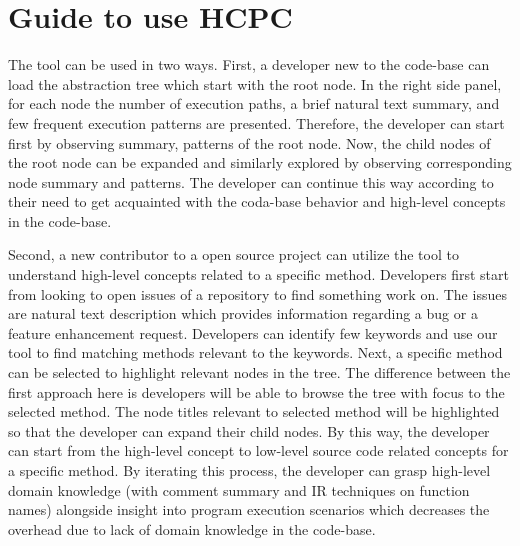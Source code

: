\section{Guide to use HCPC}
The tool can be used in two ways. First, a developer new to the code-base can load the abstraction tree which start with the root node. In the right side panel, for each node the number of execution paths, a brief natural text summary, and few frequent execution patterns are presented. Therefore, the developer can start first by observing summary, patterns of the root node. Now, the child nodes of the root node can be expanded and  similarly explored by observing corresponding node summary and patterns. The developer can continue this way according to their need to get acquainted with the coda-base behavior and high-level concepts in the code-base.

Second, a new contributor to a open source project can utilize the tool to understand high-level concepts related to a specific method. Developers first start from looking to open issues of a repository to find something work on. The issues are natural text description which provides information regarding a bug or a feature enhancement request. Developers can identify few keywords and use our tool to find matching methods relevant to the keywords. Next, a specific method can be selected to highlight relevant nodes in the tree. The difference between the first approach here is developers will be able to browse the tree with focus to the selected method. The node titles relevant to selected method will be highlighted so that the developer can expand their child nodes. By this way, the developer can start from the high-level concept to low-level source code related concepts for a specific method. By iterating this process, the developer can grasp high-level domain knowledge (with comment summary and IR techniques on function names) alongside insight into program execution scenarios which decreases the overhead due to lack of domain knowledge in the code-base. 

